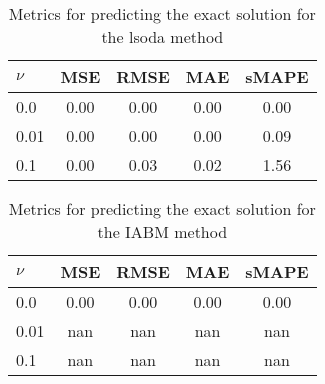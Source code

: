 \begin{table}[H]
  \caption{Metrics for predicting the exact solution for the lsoda method}\label{table:comparison_exact_metrics_lsoda}
  \centering
  \begin{tabular}{lcccc}
    \toprule
    \(\nu \) & MSE  & RMSE & MAE  & sMAPE \\
    \midrule
    0.0      & 0.00 & 0.00 & 0.00 & 0.00  \\
    0.01     & 0.00 & 0.00 & 0.00 & 0.09  \\
    0.1      & 0.00 & 0.03 & 0.02 & 1.56  \\
    \bottomrule
  \end{tabular}
\end{table}
\begin{table}[H]
  \caption{Metrics for predicting the exact solution for the IABM method}\label{table:comparison_exact_metrics_iabm}
  \centering
  \begin{tabular}{lcccc}
    \toprule
    \(\nu \) & MSE  & RMSE & MAE  & sMAPE \\
    \midrule
    0.0      & 0.00 & 0.00 & 0.00 & 0.00  \\
    0.01     & nan  & nan  & nan  & nan   \\
    0.1      & nan  & nan  & nan  & nan   \\
    \bottomrule
  \end{tabular}
\end{table}




